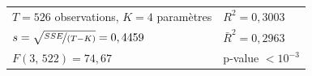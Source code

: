 \begin{tabular}{ll}
$T = 526$ observations, $K = 4$ paramètres & $R^2 = 0,3003$\\
$s = \sqrt{\nicefrac{SSE}{(T-K)}} = 0,4459$ & $\bar R^2 = 0,2963$\\
$F(3,\,522) = 74,67$ & p-value $< 10^{-3}$\\
\end{tabular}
